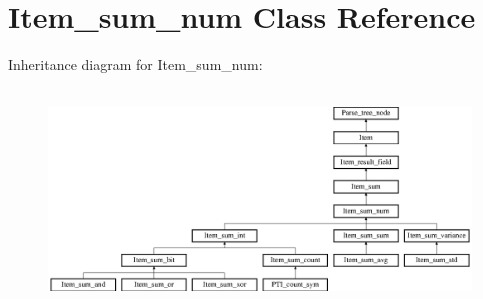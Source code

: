 \hypertarget{classItem__sum__num}{}\section{Item\+\_\+sum\+\_\+num Class Reference}
\label{classItem__sum__num}
Inheritance diagram for Item\+\_\+sum\+\_\+num\+:\begin{figure}[H]
\begin{center}
\leavevmode
\includegraphics[height=5.833333cm]{classItem__sum__num}
\end{center}
\end{figure}
